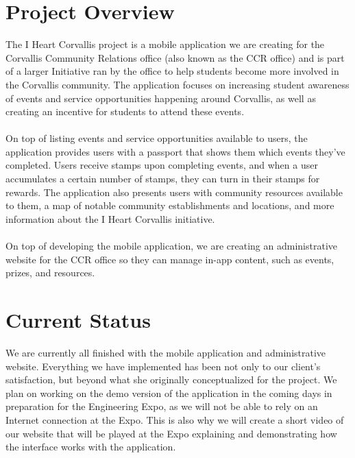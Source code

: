 \documentclass[onecolumn, draftclsnofoot,10pt, compsoc]{IEEEtran}
\begin{document}
\section{Project Overview}
	The I Heart Corvallis project is a mobile application we are creating for the Corvallis Community Relations office (also known as the CCR office) and is part of a larger Initiative ran by the office to help students become more involved in the Corvallis community. The application focuses on increasing student awareness of events and service opportunities happening around Corvallis, as well as creating an incentive for students to attend these events. \\ \\
	On top of listing events and service opportunities available to users, the application provides users with a passport that shows them which events they’ve completed. Users receive stamps upon completing events, and when a user accumulates a certain number of stamps, they can turn in their stamps for rewards. The application also presents users with community resources available to them, a map of notable community establishments and locations, and more information about the I Heart Corvallis initiative. \\ \\
  On top of developing the mobile application, we are creating an administrative website for the CCR office so they can manage in-app content, such as events, prizes, and resources.

\section{Current Status}
  We are currently all finished with the mobile application and administrative website. Everything we have implemented has been not only to our client's satisfaction, but beyond what she originally conceptualized for the project. We plan on working on the demo version of the application in the coming days in preparation for the Engineering Expo, as we will not be able to rely on an Internet connection at the Expo. This is also why we will create a short video of our website that will be played at the Expo explaining and demonstrating how the interface works with the application.
\end{document}
